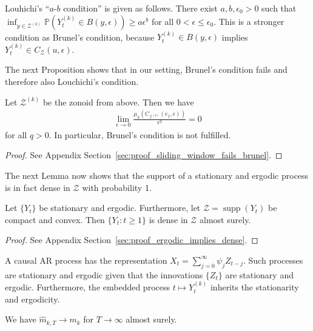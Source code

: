 Louhichi's \enquote{$a$-$b$ condition} is given as follows. There exist $a,b,\epsilon_0>0$ such that $\inf_{y\in\mathcal{Z}^{(k)}}\mathbb{P}(Y_t^{(k)}\in B(y,\epsilon))\ge a\epsilon^b$ for all $0<\epsilon\le\epsilon_0$. This is a stronger condition as Brunel's condition, because $Y_t^{(k)}\in B(y,\epsilon)$ implies $Y_t^{(k)}\in C_{\mathcal{Z}}(u,\epsilon)$.

The next Proposition shows that in our setting, Brunel's condition fails and therefore also Louchichi's condition.

\begin{Prop}\label{prop:sliding_window_fails_brunel}
    Let $\mathcal{Z}^{(k)}$ be the zonoid from above. Then we have
    \begin{align*}
        \lim_{\epsilon\to0}\frac{\mu_k(C_{\mathcal{Z}^{(k)}}(e_1,\epsilon))}{\epsilon^{q}}=0
    \end{align*}
    for all $q>0$. In particular, Brunel's condition is not fulfilled.
\end{Prop}

\begin{proof}
    See Appendix Section~\ref{sec:proof_sliding_window_fails_brunel}.
\end{proof}

The next Lemma now shows that the support of a stationary and ergodic process is in fact dense in $\mathcal{Z}$ with probability 1. 

\begin{Lem}\label{lem:ergodic_implies_dense}
    Let $\{Y_t\}$ be stationary and ergodic. Furthermore, let $\mathcal{Z}=\operatorname{supp}(Y_t)$ be compact and convex. Then $\{Y_t:t\ge 1\}$ is dense in $\mathcal{Z}$ almost surely.
\end{Lem}

\begin{proof}
    See Appendix Section~\ref{sec:proof_ergodic_implies_dense}.
\end{proof}

\begin{Rem}\label{rem:ar_ergodic}
    A causal AR process has the representation $X_t=\sum_{j=0}^{\infty}\psi_jZ_{t-j}$. Such processes are stationary and ergodic given that the innovations $\{Z_t\}$ are stationary and ergodic. Furthermore, the embedded process $t\mapsto Y_t^{(k)}$ inherits the stationarity and ergodicity.
\end{Rem}

\begin{Cor}\label{cor:main}
    We have $\hat{m}_{k,T}\to m_k$ for $T\to\infty$ almost  surely.
\end{Cor}

